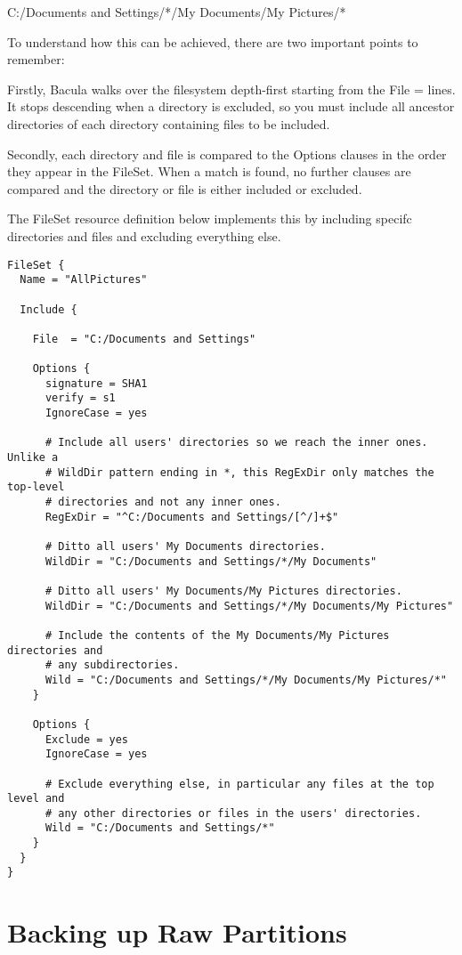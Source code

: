C:/Documents and Settings/*/My Documents/My Pictures/*

To understand how this can be achieved, there are two important points to
remember:

Firstly, Bacula walks over the filesystem depth-first starting from the File =
lines.  It stops descending when a directory is excluded, so you must include
all ancestor directories of each directory containing files to be included.

Secondly, each directory and file is compared to the Options clauses in the
order they appear in the FileSet.  When a match is found, no further clauses
are compared and the directory or file is either included or excluded.

The FileSet resource definition below implements this by including specifc
directories and files and excluding everything else.

\footnotesize
\begin{verbatim}
FileSet {
  Name = "AllPictures"

  Include {

    File  = "C:/Documents and Settings"

    Options {
      signature = SHA1
      verify = s1
      IgnoreCase = yes

      # Include all users' directories so we reach the inner ones.  Unlike a
      # WildDir pattern ending in *, this RegExDir only matches the top-level
      # directories and not any inner ones.
      RegExDir = "^C:/Documents and Settings/[^/]+$"

      # Ditto all users' My Documents directories.
      WildDir = "C:/Documents and Settings/*/My Documents"

      # Ditto all users' My Documents/My Pictures directories.
      WildDir = "C:/Documents and Settings/*/My Documents/My Pictures"

      # Include the contents of the My Documents/My Pictures directories and
      # any subdirectories.
      Wild = "C:/Documents and Settings/*/My Documents/My Pictures/*"
    }

    Options {
      Exclude = yes
      IgnoreCase = yes

      # Exclude everything else, in particular any files at the top level and
      # any other directories or files in the users' directories.
      Wild = "C:/Documents and Settings/*"
    }
  }
}
\end{verbatim}
\normalsize

\section{Backing up Raw Partitions}

